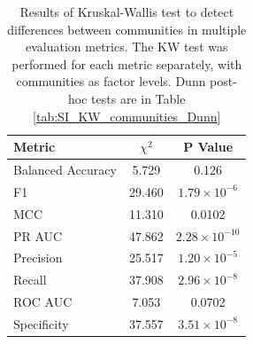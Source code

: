 \documentclass[oneside, a4paper, onecolumn, 11pt]{article}
\begin{document}
\begin{refsection}
\begin{table}[ht]
    \centering
    \caption{Results of Kruskal-Wallis test to detect differences between communities in multiple evaluation metrics. The KW test was performed for each metric separately, with communities as factor levels. Dunn post-hoc tests are in Table \ref{tab:SI_KW_communities_Dunn}}
    \begin{tabular}{|l|c|c|}
        \hline
        Metric & $\chi^2$ & P Value \\
        \hline
        Balanced Accuracy & 5.729 & 0.126 \\
        F1 & 29.460 & $1.79 \times 10^{-6}$ \\
        MCC & 11.310 & 0.0102 \\
        PR AUC & 47.862 & $2.28 \times 10^{-10}$ \\
        Precision & 25.517 & $1.20 \times 10^{-5}$ \\
        Recall & 37.908 & $2.96 \times 10^{-8}$ \\
        ROC AUC & 7.053 & 0.0702 \\
        Specificity & 37.557 & $3.51 \times 10^{-8}$ \\
        \hline
    \end{tabular}
    \label{tab:SI_KW_communities}
\end{table}


\end{refsection}
\end{document}
